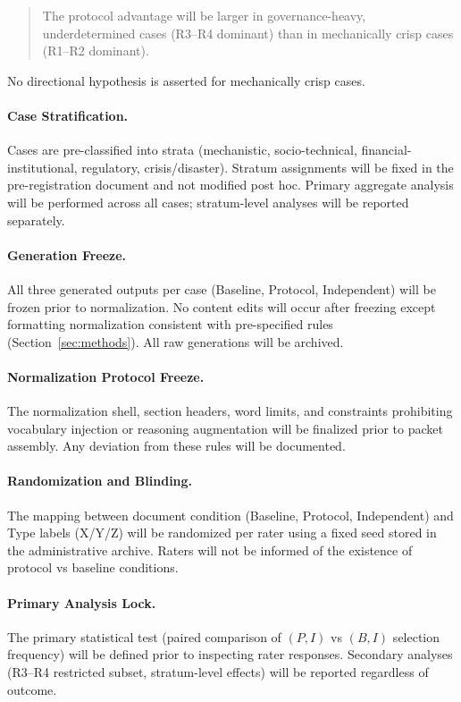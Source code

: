 \begin{quote}
The protocol advantage will be larger in governance-heavy, underdetermined cases (R3--R4 dominant) than in mechanically crisp cases (R1--R2 dominant).
\end{quote}

No directional hypothesis is asserted for mechanically crisp cases.

\paragraph{Case Stratification.}
Cases are pre-classified into strata (mechanistic, socio-technical, financial-institutional, regulatory, crisis/disaster). Stratum assignments will be fixed in the pre-registration document and not modified post hoc. Primary aggregate analysis will be performed across all cases; stratum-level analyses will be reported separately.

\paragraph{Generation Freeze.}
All three generated outputs per case (Baseline, Protocol, Independent) will be frozen prior to normalization. No content edits will occur after freezing except formatting normalization consistent with pre-specified rules (Section~\ref{sec:methods}). All raw generations will be archived.

\paragraph{Normalization Protocol Freeze.}
The normalization shell, section headers, word limits, and constraints prohibiting vocabulary injection or reasoning augmentation will be finalized prior to packet assembly. Any deviation from these rules will be documented.

\paragraph{Randomization and Blinding.}
The mapping between document condition (Baseline, Protocol, Independent) and Type labels (X/Y/Z) will be randomized per rater using a fixed seed stored in the administrative archive. Raters will not be informed of the existence of protocol vs baseline conditions.

\paragraph{Primary Analysis Lock.}
The primary statistical test (paired comparison of $(P,I)$ vs $(B,I)$ selection frequency) will be defined prior to inspecting rater responses. Secondary analyses (R3--R4 restricted subset, stratum-level effects) will be reported regardless of outcome.

